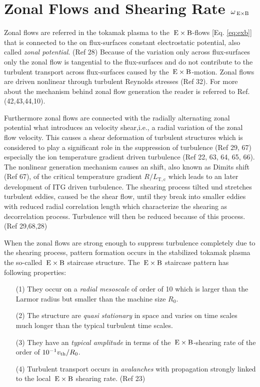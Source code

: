 \section{Zonal Flows and Shearing Rate $\omega_{\mathrm{\:E \times B}}$}
\label{sec:zonalflow}

Zonal flows are referred in the tokamak plasma to the $\mathrm{\:E}\times\mathrm{B}$-flows [Eq. \ref{eq:exb}] that is connected to the on flux-surfaces constant electrostatic potential, also called \textit{zonal potential}. (Ref 28) Because of the variation only across flux-surfaces only the zonal flow is tangential to the flux-surfaces and do not contribute to the turbulent transport across flux-surfaces caused by the $\mathrm{\:E}\times\mathrm{B}$-motion. 
Zonal flows are driven nonlinear through turbulent Reynolds stresses (Ref 32). For more about the mechanism behind zonal flow generation the reader is referred to Ref. (42,43,44,10). \bigskip

Furthermore zonal flows are connected with the radially alternating zonal potential what introduces an velocity shear,i.e., a radial variation of the zonal flow velocity. This causes a shear deformation of turbulent structures which is considered to play a significant role in the suppression of turbulence (Ref 29, 67) especially the ion temperature gradient driven turbulence (Ref 22, 63, 64, 65, 66). The nonlinear generation mechanism causes an shift, also known as Dimits shift (Ref 67), of the critical temperature gradient $R/L_\mathrm{T,c}$ which leads to an later development of ITG driven turbulence. The shearing process tilted und stretches turbulent eddies, caused be the shear flow, until they break into smaller eddies with reduced radial correlation length which characterize the shearing as decorrelation process. Turbulence will then be reduced because of this process. (Ref 29,68,28)  \bigskip

When the zonal flows are strong enough to suppress turbulence completely due to the shearing process, pattern formation occurs in the stabilized tokamak plasma the so-called $\mathrm{\:E}\times\mathrm{B}$ staircase structure. The $\mathrm{\:E}\times\mathrm{B}$ staircase pattern has following properties:
\begin{enumerate}
	\item[(1)] They occur on a \textit{radial mesoscale} of order of 10 \rhoth which is larger than the Larmor radius but smaller than the machine size $R_0$.
	\item[(2)] The structure are \textit{quasi stationary} in space and varies on time scales much longer than the typical turbulent time scales.
	\item[(3)] They have an \textit{typical amplitude} in terms of the $\mathrm{\:E}\times\mathrm{B}$-shearing rate of the order of $10^{-1} v_{\mathrm{th}}/R_0$.
	\item[(4)] Turbulent transport occurs in \textit{avalanches} with propagation strongly linked to the local $\mathrm{\:E}\times\mathrm{B}$ shearing rate. (Ref 23)
\end{enumerate} \bigskip

